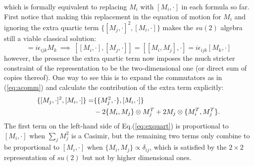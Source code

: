 which is formally equivalent to replacing $M_i$ with $[M_i, \cdot ]$ in each formula so far. First notice that making this replacement in the equation of motion for $M_i$ and ignoring the extra quartic term $\{[M_j, \cdot ]^2, [M_i, \cdot ] \}$ makes the $su(2)$ algebra still a viable classical solution: 
\begin{equation}
[M_i, M_j] = i \epsilon_{ijk} M_k \ \implies \ [[M_i, \cdot ], [M_j, \cdot ]] = [[M_i, M_j], \cdot ] = i \epsilon_{ijk} [M_k, \cdot ]
\end{equation}
however, the presence the extra quartic term now imposes the much stricter constraint of the representation to be the two-dimensional one (or direct sum of copies thereof). One way to see this is to expand the commutators as in (\ref{eq:acomm}) and calculate the contribution of the extra term explicitly:
\begin{align}\label{eq:exquart}
\{[M_j, \cdot ]^2, [M_i, \cdot ] \} = &\{ \{M_j^2, \cdot\}, [M_i, \cdot ] \} \\ \notag
& -2 \{ M_i , M_j \} \otimes M_j^T + 2 M_j \otimes \{ M_i^T, M_j^T \}.
\end{align}
The first term on the left-hand side of Eq.(\ref{eq:exquart}) is proportional to $[M_i, \cdot ]$ when $\sum_j M_j^2$ is a Casimir, but the remaining two terms only combine to be proportional to $[M_i, \cdot ]$ when $\{ M_i, M_j \} \propto \delta_{ij}$, which is satisfied by the $2 \times 2$ representation of $su(2)$ but not by higher dimensional ones.  




